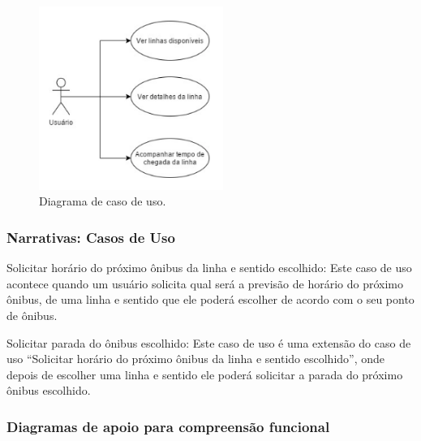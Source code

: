 \documentclass[
	12pt,				%
	oneside,			%
	a4paper,			%
	brazil				%
]{abntex2}
\begin{document}
\begin{figure}[!h]
\centering
\includegraphics[width=6cm, center]{images/use-case-diagram.png}
\caption{Diagrama de caso de uso.}
\label{Rotulo}
\end{figure}

\subsubsection{Narrativas: Casos de Uso}

Solicitar horário do próximo ônibus da linha e sentido escolhido: Este caso de uso acontece quando um usuário solicita qual será a previsão de horário do próximo ônibus, de uma linha e sentido que ele poderá escolher de acordo com o seu ponto de ônibus.

Solicitar parada do ônibus escolhido: Este caso de uso é uma extensão do caso de uso “Solicitar horário do próximo ônibus da linha e sentido escolhido”, onde depois de escolher uma linha e sentido ele poderá solicitar a parada do próximo ônibus escolhido.

\newpage

\subsubsection{Diagramas de apoio para compreensão funcional}
\end{document}
